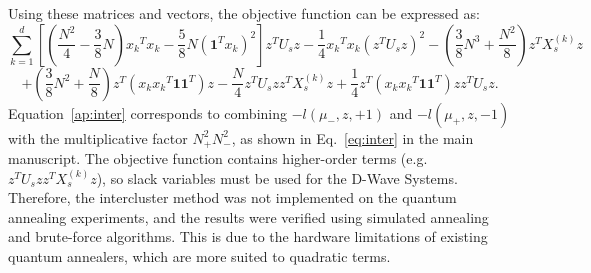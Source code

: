\documentclass[showpacs,twocolumn,superscriptaddress]{revtex4-2}
\begin{document}
Using these matrices and vectors, the objective function can be expressed as:
\begin{equation}
    \sum_{k=1}^d \left[\left(\frac{N^2}{4}-\frac{3}{8}N\right){x_k}^Tx_k - \frac{5}{8}N(\mathbf{1}^T{x_k})^2\right]z^TU_sz - \frac{1}{4}{x_k}^T{x_k}(z^TU_sz)^2-(\frac{3}{8}N^3+\frac{N^2}{8})z^TX_s^{(k)}z\nonumber
\end{equation}
\begin{equation}\label{ap:inter}
    + \left(\frac{3}{8}N^2+\frac{N}{8}\right)z^T({x_k}{x_k}^T\mathbf{1}\mathbf{1}^T)z -\frac{N}{4}z^TU_szz^TX_s^{(k)}z + \frac{1}{4}z^T({x_k}{x_k}^T\mathbf{1}\mathbf{1}^T)zz^TU_sz.
\end{equation}
Equation~\eqref{ap:inter} corresponds to combining $-l(\mu_-,z,+1)$ and $-l(\mu_+,z,-1)$ with the multiplicative factor $N_{+}^2 N_{-}^2$, as shown in Eq.~\eqref{eq:inter} in the main manuscript.
The objective function contains higher-order terms (e.g. $z^TU_szz^TX_s^{(k)}z$), so slack variables must be used for the D-Wave Systems. Therefore, the intercluster method was not implemented on the quantum annealing experiments, and the results were verified using simulated annealing and brute-force algorithms. This is due to the hardware limitations of existing quantum annealers, which are more suited to quadratic terms.
\end{document}
